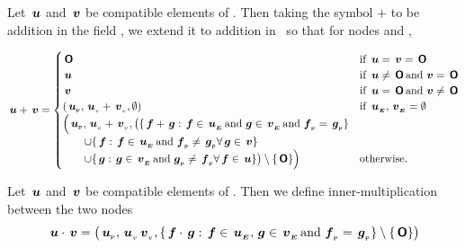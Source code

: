 
\begin{definition}
  \label{deftree+}
  Let $\node{u}$ and $\node{v}$ be compatible elements of \TDOM. Then taking the
  symbol $+$ to be addition in the field \TFIELD, we extend  it to addition in
  \TDOM\ so that for nodes  and ,

  \begin{align}
    \node{u}+\node{v}=\begin{cases}
    \nulltree & \text {if } \node{u} = \node{v} = \nulltree \\
    \node{u} & \text {if } \node{u} \neq \nulltree \mand  \node{v} = \nulltree \\
    \node{v} & \text {if } \node{u} = \nulltree \mand \node{v} \neq \nulltree  \\
    (\nlabel{u}, \nv{u} + \nv{v}, \emptyset) & \text{if } \extn{u}, \extn{v} = \emptyset \\
    \Bigl(\nlabel{u}, \nv{u} + \nv{v}, \bigl(\{\node{f}+\node{g}:\node{f}\in\extn{u}\mand\node{g}\in\extn{v}\mand\nlabel{f}=\nlabel{g}\} & \\
    \qquad\cup\{\node{f}:\node{f}\in\extn{u}\mand\nlabel{f}\neq\nlabel{g}\forall\node{g}\in\node{v}\} & \\
    \qquad\cup\{\node{g}:\node{g}\in\extn{v}\mand\nlabel{g}\neq\nlabel{f}\forall\node{f}\in\node{u}\}\bigr)\setminus\{\nulltree\}\Bigr)  & \text{otherwise.}
    \end{cases}
  \end{align}
\end{definition}


\begin{definition}
  \label{deftree*}
  Let $\node{u}$ and $\node{v}$ be compatible elements of \TDOM. Then 
  we define inner-multiplication between the two nodes
  \begin{equation}
    \node{u}\cdot\node{v} = \bigl(\nlabel{u}, \nv{u} \nv{v}, \{\node{f}\cdot\node{g}: \node{f} \in \extn{u},\node{g} \in \extn{v} \mand \nlabel{f} = \nlabel{g}\}\setminus\{\nulltree\}\bigr)
  \end{equation} 
\end{definition}



